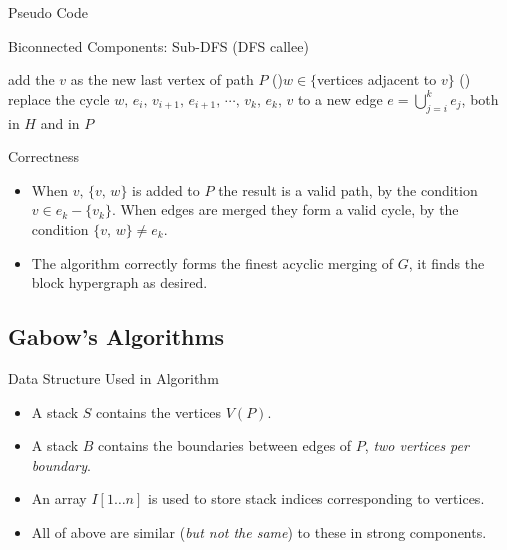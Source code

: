 \documentclass{beamer}
\begin{document}
\begin{frame}{Pseudo Code}
	\SetAlFnt{\small}
	\begin{algorithm}[H]
		\caption{Biconnected Components: Sub-DFS (DFS callee)}
		add the $v$ as the new last vertex of path $P$\;
		\For(){$w\in \{$vertices adjacent to $v\}$}{
			\Else(){
				replace the cycle $w,\,e_i,\,v_{i+1},\,e_{i+1},\,\cdots,\,v_k,\,e_k,\,v$
				to a new edge $e=\bigcup_{j=i}^ke_j$, both in $H$ and in $P$\;
			}
		}
	\end{algorithm}
\end{frame}

\begin{frame}{Correctness}
	\begin{itemize}
		\item
		When $v,\,\{v,\,w\}$ is added to $P$ the result is a valid path, by the
		condition $v\in e_k-\{v_k\}$. When edges are merged they form a valid cycle,
		by the condition $\{v,\,w\}\neq e_k$.
		\item
		The algorithm correctly forms the finest acyclic merging of $G$, it finds
		the block hypergraph as desired.
	\end{itemize}
\end{frame}

\subsection{Gabow's Algorithms}

\begin{frame}{Data Structure Used in Algorithm}
	\begin{itemize}
		\item
		A \alert{stack $S$} contains the vertices $V(P)$.
		\item
		A \alert{stack $B$} contains the boundaries between edges of $P$, \emph{two vertices per boundary}.
		\item
		An array \alert{$I[1\ldots n]$} is used to store stack indices corresponding to vertices.
		\item
		All of above are similar (\emph{but not the same}) to these in strong components.
	\end{itemize}
\end{frame}
\end{document}
